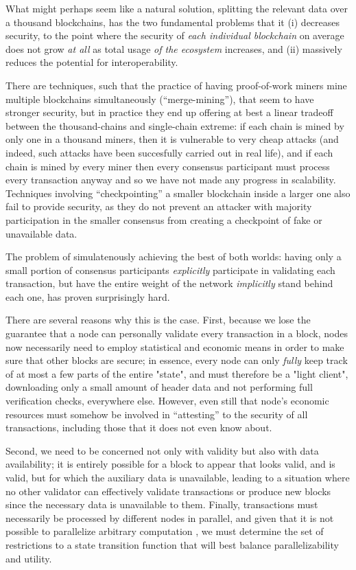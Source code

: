 \documentclass[11pt,a4paper]{article}
\theoremstyle{plain}
\theoremstyle{definition}
\theoremstyle{remark}
\begin{document}
What might perhaps seem like a natural solution, splitting the relevant data over a thousand blockchains, has the two fundamental problems that it (i) decreases security, to the point where the security of \emph{each individual blockchain} on average does not grow \emph{at all} as total usage \emph{of the ecosystem} increases, and (ii) massively reduces the potential for interoperability.

There are techniques, such that the practice of having proof-of-work miners mine multiple blockchains simultaneously (``merge-mining''), that seem to have stronger security, but in practice they end up offering at best a linear tradeoff between the thousand-chains and single-chain extreme: if each chain is mined by only one in a thousand miners, then it is vulnerable to very cheap attacks\cite{mmpetertodd} (and indeed, such attacks have been succesfully carried out in real life\cite{coiledcoin}), and if each chain is mined by every miner then every consensus participant must process every transaction anyway and so we have not made any progress in scalability. Techniques involving ``checkpointing'' a smaller blockchain inside a larger one also fail to provide security, as they do not prevent an attacker with majority participation in the smaller consensus from creating a checkpoint of fake or unavailable data.\cite{factompetertodd}

The problem of simulatenously achieving the best of both worlds: having only a small portion of consensus participants \emph{explicitly} participate in validating each transaction, but have the entire weight of the network \emph{implicitly} stand behind each one, has proven surprisingly hard.

There are several reasons why this is the case. First, because we lose the guarantee that a node can personally validate every transaction in a block, nodes now necessarily need to employ statistical and economic means in order to make sure that other blocks are secure; in essence, every node can only \emph{fully} keep track of at most a few parts of the entire "state", and must therefore be a "light client", downloading only a small amount of header data and not performing full verification checks, everywhere else. However, even still that node's economic resources must somehow be involved in ``attesting'' to the security of all transactions, including those that it does not even know about.

Second, we need to be concerned not only with validity but also with data availability; it is entirely possible for a block to appear that looks valid, and is valid, but for which the auxiliary data is unavailable, leading to a situation where no other validator can effectively validate transactions or produce new blocks since the necessary data is unavailable to them. Finally, transactions must necessarily be processed by different nodes in parallel, and given that it is not possible to parallelize arbitrary computation \cite{parallelcomputing}, we must determine the set of restrictions to a state transition function that will best balance parallelizability and utility.
\end{document}
